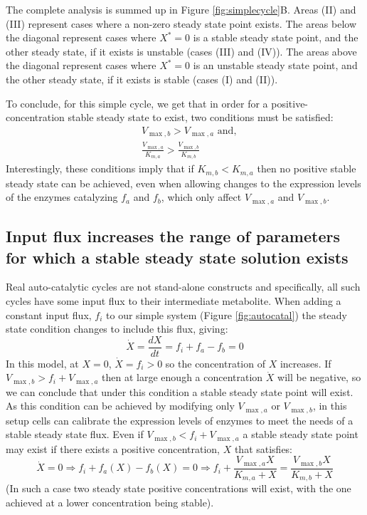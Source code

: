 \documentclass[a4page,notitlepage]{article}
\begin{document}
    The complete analysis is summed up in Figure \ref{fig:simplecycle}B.
    Areas (II) and (III) represent cases where a non-zero steady state point exists.
    The areas below the diagonal represent cases where $X^*=0$ is a stable steady state point, and the other steady state, if it exists is unstable (cases (III) and (IV)).
    The areas above the diagonal represent cases where $X^*=0$ is an unstable steady state point, and the other steady state, if it exists is stable (cases (I) and (II)).
    

    To conclude, for this simple cycle, we get that in order for a positive-concentration stable steady state to exist, two conditions must be satisfied:
    $$
    \begin{aligned}
      & V_{\max,b}>V_{\max,a} \text{ and,}\\
      & \frac{V_{\max,a}}{K_{m,a}}>\frac{V_{\max,b}}{K_{m,b}}
    \end{aligned}
    $$
    Interestingly, these conditions imply that if $K_{m,b}<K_{m,a}$ then no positive stable steady state can be achieved, even when allowing changes to the expression levels of the enzymes catalyzing $f_a$ and $f_b$, which only affect $V_{\max,a}$ and $V_{\max,b}$.
    
    \subsection{Input flux increases the range of parameters for which a stable steady state solution exists}
    Real auto-catalytic cycles are not stand-alone constructs and specifically, all such cycles have some input flux to their intermediate metabolite.
    When adding a constant input flux, $f_i$ to our simple system (Figure \ref{fig:autocatal}) the steady state condition changes to include this flux, giving:
    \begin{equation*}
      \dot X = \frac{dX}{dt} = f_i + f_a - f_b = 0
    \end{equation*}
    In this model, at $X=0$, $\dot X=f_i>0$ so the concentration of $X$ increases. 
    If $V_{\max,b}>f_i+V_{\max,a}$ then at large enough a concentration $\dot X$ will be negative, so we can conclude that under this condition a stable steady state point will exist.
    As this condition can be achieved by modifying only $V_{\max,a}$ or $V_{\max,b}$, in this setup cells can calibrate the expression levels of enzymes to meet the needs of a stable steady state flux.
    Even if $V_{\max,b}<f_i+V_{\max,a}$ a stable steady state point may exist if there exists a positive concentration, $X$ that satisfies:
    \begin{equation*}
        \dot X = 0 \Rightarrow f_i + f_a(X) - f_b(X) = 0 \Rightarrow f_i+\frac{V_{\max,a}X}{K_{m,a}+X} = \frac{V_{\max,b}X}{K_{m,b}+X} 
    \end{equation*}
    (In such a case two steady state positive concentrations will exist, with the one achieved at a lower concentration being stable).
\end{document}

